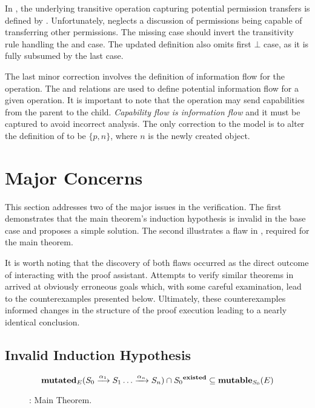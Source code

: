 In \TMSW{}, the underlying transitive operation capturing potential permission transfers is defined by \transaccess{}.
Unfortunately, \transaccess{} neglects a discussion of \writeright{} permissions being capable of transferring other permissions.
The missing case should invert the transitivity rule handling the \readright{} and \execright{} case.
The updated definition also omits first \(\bot\) case, as it is fully subsumed by the last case.

The last minor correction involves the definition of information flow for the \create{} operation.
The \readfrom{} and \wroteto{} relations are used to define potential information flow for a given operation.
It is important to note that the \create{} operation may send capabilities from the parent to the child.
\emph{Capability flow is information flow} and it must be captured to avoid incorrect analysis.
The only correction to the \TMSW{} model is to alter the definition of  to be \(\{p,n\}\), where \(n\) is the newly created object.

\section{Major Concerns}

This section addresses two of the major issues in the \TMSW{} verification.
The first demonstrates that the main theorem's induction hypothesis is invalid in the base case and proposes a simple solution.
The second illustrates a flaw in \thmauthred{}, required for the main theorem.

It is worth noting that the discovery of both flaws occurred as the direct outcome of interacting with the proof assistant.
Attempts to verify similar theorems in \TMmodelName{} arrived at obviously erroneous goals which, with some careful examination, lead to the counterexamples presented below.
Ultimately, these counterexamples informed changes in the structure of the proof execution leading to a nearly identical conclusion.

\subsection{Invalid Induction Hypothesis}
\label{sec:SW:basecase}
\begin{figure}
\[
\mathbf{mutated}_{E}(S_0 \xrightarrow {\alpha_1} S_1 \dots \xrightarrow {\alpha_{n}} S_{n}) \cap {S_0}^{\mathbf{existed}} \subseteq \mathbf{mutable}_{S_0}(E)
\]
\caption{\modellbl{} : Main Theorem.\label{def:SW:mainTheorem}}
\end{figure}


